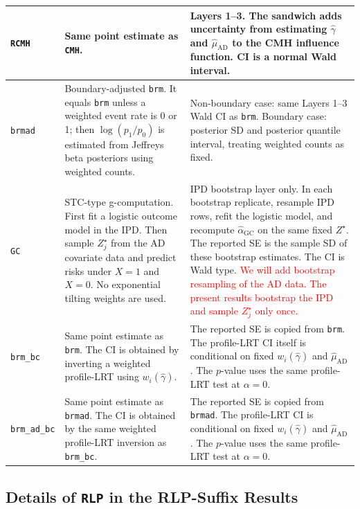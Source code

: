 \documentclass[11pt,a4paper]{article}
\begin{document}
\begin{center}
\begin{tabular}{|p{}|p{}|p{}|}
\\
\hline
\texttt{RCMH}
&
Same point estimate as \texttt{CMH}.
&
Layers 1--3.  The sandwich adds uncertainty from estimating
\(\widehat\gamma\) and \(\widehat\mu_{\mathrm{AD}}\) to the CMH influence
function. CI is a normal Wald interval.
\\
\hline
\texttt{brmad}
&
Boundary-adjusted \texttt{brm}.  It equals \texttt{brm} unless a weighted event
rate is 0 or 1; then \(\log(p_1/p_0)\) is estimated from Jeffreys beta
posteriors using weighted counts.
&
Non-boundary case: same Layers 1--3 Wald CI as \texttt{brm}.  Boundary case:
posterior SD and posterior quantile interval, treating weighted counts as fixed.
\\
\hline
\texttt{GC}
&
STC-type g-computation.  First fit a logistic outcome model in the IPD.  Then
sample \(Z_j^\star\) from the AD covariate data and predict risks under
\(X=1\) and \(X=0\).  No exponential tilting weights are used.
&
IPD bootstrap layer only.  In each bootstrap replicate, resample IPD rows, refit
the logistic model, and recompute \(\widehat\alpha_{\mathrm{GC}}\) on the same
fixed \(Z^\star\).  The reported SE is the sample SD of these bootstrap
estimates.  The CI is Wald type.
\textcolor{red}{We will add bootstrap resampling of the AD data.  The present
results bootstrap the IPD and sample \(Z_j^\star\) only once.}
\\
\hline
\texttt{brm\_bc}
&
Same point estimate as \texttt{brm}.  The CI is obtained by inverting a
weighted profile-LRT using \(w_i(\widehat\gamma)\).
&
The reported SE is copied from \texttt{brm}.  The profile-LRT CI itself is
conditional on fixed \(w_i(\widehat\gamma)\) and
\(\widehat\mu_{\mathrm{AD}}\).  The \(p\)-value uses the same profile-LRT test
at \(\alpha=0\).
\\
\hline
\texttt{brm\_ad\_bc}
&
Same point estimate as \texttt{brmad}.  The CI is obtained by the same weighted
profile-LRT inversion as \texttt{brm\_bc}.
&
The reported SE is copied from \texttt{brmad}.  The profile-LRT CI is
conditional on fixed \(w_i(\widehat\gamma)\) and
\(\widehat\mu_{\mathrm{AD}}\).  The \(p\)-value uses the same profile-LRT test
at \(\alpha=0\).
\\
\hline
\end{tabular}
\end{center}

\subsection{Details of \texttt{RLP} in the RLP-Suffix Results}
\end{document}
